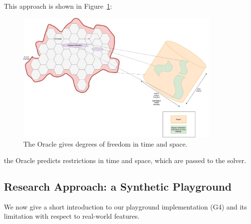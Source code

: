 \documentclass{article}
\begin{document}
This approach is shown in Figure~\ref{fig:introduction_time_space}:
%
\begin{figure}[hbtp]
	\centering
  \includegraphics[width=0.9\textwidth]{introduction_time_space.png}
	\caption{The Oracle gives degrees of freedom in time and space.}
	\label{fig:introduction_time_space}
\end{figure}
the Oracle predicts restrictions in time and space, which are passed to the solver.

\subsection{Research Approach: a Synthetic Playground}\label{subsec:playground}
We now give a short introduction to our playground implementation (G4) and its limitation with respect to real-world features.
\end{document}
